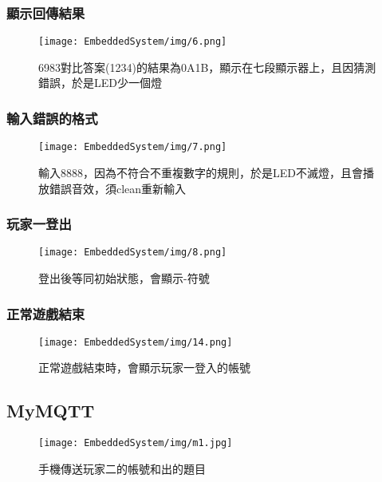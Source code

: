 \documentclass{scrartcl}
\begin{document}
\FloatBarrier
\newpage
\subsubsection{顯示回傳結果}
\begin{figure}[h]
  \centering
  \texttt{[image: EmbeddedSystem/img/6.png]}
  \caption{6983對比答案(1234)的結果為0A1B，顯示在七段顯示器上，且因猜測錯誤，於是LED少一個燈}
  \label{fig6}
\end{figure}

\FloatBarrier
\newpage
\subsubsection{輸入錯誤的格式}
\begin{figure}[h]
  \centering
  \texttt{[image: EmbeddedSystem/img/7.png]}
  \caption{輸入8888，因為不符合不重複數字的規則，於是LED不滅燈，且會播放錯誤音效，須clean重新輸入}
  \label{fig7}
\end{figure}

\FloatBarrier
\newpage
\subsubsection{玩家一登出}
\begin{figure}[h]
  \centering
  \texttt{[image: EmbeddedSystem/img/8.png]}
  \caption{登出後等同初始狀態，會顯示-符號}
  \label{fig8}
\end{figure}

\FloatBarrier
\newpage
\subsubsection{正常遊戲結束}
\begin{figure}[h]
  \centering
  \texttt{[image: EmbeddedSystem/img/14.png]}
  \caption{正常遊戲結束時，會顯示玩家一登入的帳號}
  \label{fig14}
\end{figure}

\FloatBarrier
\newpage
\subsection{MyMQTT}
\begin{figure}[h]
  \centering
  \texttt{[image: EmbeddedSystem/img/m1.jpg]}
  \caption{手機傳送玩家二的帳號和出的題目}
  \label{fig15}
\end{figure}
\end{document}
